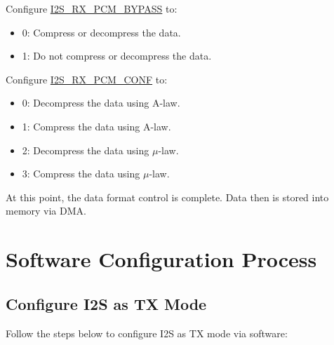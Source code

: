 \documentclass[main\_\_CN.tex]{subfiles}
\begin{document}
Configure  \hyperref[fielddesc:I2SRXPCMBYPASS]{I2S\_RX\_PCM\_BYPASS} to:
\begin{itemize}
\item 0: Compress or decompress the data.
\item 1: Do not compress or decompress the data.
\end{itemize}
Configure  \hyperref[fielddesc:I2SRXPCMCONF]{I2S\_RX\_PCM\_CONF} to:
\begin{itemize}
\item 0: Decompress the data using A-law.
\item 1: Compress the data using A-law.
\item 2: Decompress the data using $\mu$-law.
\item 3: Compress the data using $\mu$-law.
\end{itemize}
At this point, the data format control is complete. Data then is stored into memory via DMA.

\section{Software Configuration Process}
\subsection{Configure I2S as TX Mode}\label{sec:configure-i2s-as-tx-mode}
Follow the steps below to configure I2S as TX mode via software:
\end{document}
